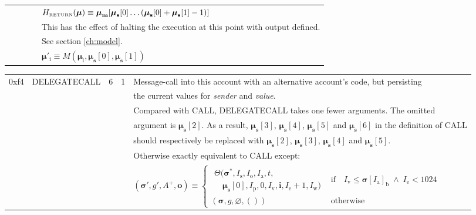 \documentclass[9pt,oneside]{amsart}
\begin{document}
\begin{tabular*}{\columnwidth}[h]{rlrrl}
&&&& $H_{\text{\tiny RETURN}}(\boldsymbol{\mu}) \equiv \boldsymbol{\mu}_{\mathbf{m}}[ \boldsymbol{\mu}_{\mathbf{s}}[0] \dots ( \boldsymbol{\mu}_{\mathbf{s}}[0] + \boldsymbol{\mu}_{\mathbf{s}}[1] - 1 ) ]$ \\
&&&& This has the effect of halting the execution at this point with output defined.\\
&&&& See section \ref{ch:model}. \\
&&&& $\boldsymbol{\mu}'_{\mathrm{i}} \equiv M(\boldsymbol{\mu}_{\mathrm{i}}, \boldsymbol{\mu}_{\mathbf{s}}[0], \boldsymbol{\mu}_{\mathbf{s}}[1])$ \\
\end{tabular*}

\begin{tabular*}{\columnwidth}[h]{rlrrl}
\midrule
0xf4 & {\small DELEGATECALL} & 6 & 1 & Message-call into this account with an alternative account's code, but persisting\\
&&&& the current values for {\it sender} and {\it value}. \\
&&&& Compared with {\small CALL}, {\small DELEGATECALL} takes one fewer arguments.  The omitted\\
&&&& argument is $\boldsymbol{\mu}_{\mathbf{s}}[2]$. As a result, $\boldsymbol{\mu}_{\mathbf{s}}[3]$, $\boldsymbol{\mu}_{\mathbf{s}}[4]$, $\boldsymbol{\mu}_{\mathbf{s}}[5]$ and $\boldsymbol{\mu}_{\mathbf{s}}[6]$ in the definition of {\small CALL} \\
&&&& should respectively be replaced with $\boldsymbol{\mu}_{\mathbf{s}}[2]$, $\boldsymbol{\mu}_{\mathbf{s}}[3]$, $\boldsymbol{\mu}_{\mathbf{s}}[4]$ and $\boldsymbol{\mu}_{\mathbf{s}}[5]$. \\
&&&& Otherwise exactly equivalent to {\small CALL} except: \\
&&&& $(\boldsymbol{\sigma}', g', A^+, \mathbf{o}) \equiv \begin{cases}\begin{array}{l}\Theta(\boldsymbol{\sigma}^*, I_{\mathrm{s}}, I_{\mathrm{o}}, I_{\mathrm{a}}, t,\\\quad \boldsymbol{\mu}_{\mathbf{s}}[0], I_{\mathrm{p}}, 0, I_{\mathrm{v}}, \mathbf{i}, I_{\mathrm{e}} + 1, I_{\mathrm{w}})\end{array} & \text{if} \quad I_{\mathrm{v}} \leqslant \boldsymbol{\sigma}[I_{\mathrm{a}}]_{\mathrm{b}} \;\wedge\; I_{\mathrm{e}} < 1024 \\ (\boldsymbol{\sigma}, g, \varnothing, ()) & \text{otherwise} \end{cases}$ \\

\end{tabular*}
\end{document}

